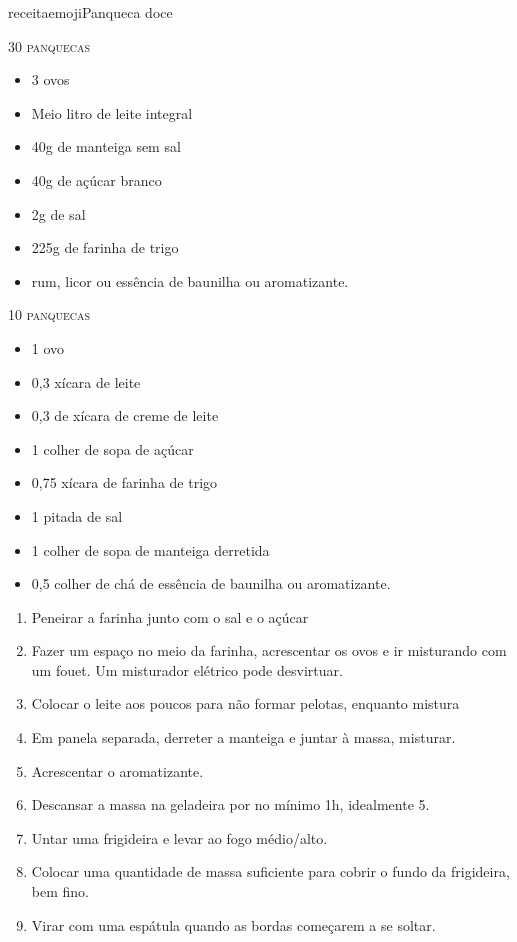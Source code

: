 receitaemoji{Panqueca doce}{

		\textsc{30 panquecas}

		\begin{itemize}
			\item 3 ovos
			\item Meio litro de leite integral
			\item 40g de manteiga sem sal
			\item 40g de açúcar branco
			\item 2g de sal
			\item 225g de farinha de trigo
			\item rum, licor ou essência de baunilha ou aromatizante.
		\end{itemize}

		\textsc{10 panquecas}
		\begin{itemize}
			\item 1 ovo
			\item 0,3 xícara de leite
			\item 0,3 de xícara de creme de leite
			\item 1 colher de sopa de açúcar
			\item 0,75 xícara de farinha de trigo
			\item 1 pitada de sal
			\item 1 colher de sopa de manteiga derretida
			\item 0,5 colher de chá de essência de baunilha ou aromatizante.
		\end{itemize}
	}{
		\begin{enumerate}
			\item Peneirar a farinha junto com o sal e o açúcar
			\item Fazer um espaço no meio da farinha, acrescentar os ovos e ir misturando
			      com um fouet. Um misturador elétrico pode desvirtuar.
			\item Colocar o leite aos poucos para não formar pelotas, enquanto mistura
			\item Em panela separada, derreter a manteiga e juntar à massa, misturar.
			\item Acrescentar o aromatizante.
			\item Descansar a massa na geladeira por no mínimo 1h, idealmente 5.
			\item Untar uma frigideira e levar ao fogo médio/alto.
			\item Colocar uma quantidade de massa suficiente para cobrir o fundo da
			      frigideira, bem fino.
			\item Virar com uma espátula quando as bordas começarem a se soltar.
		\end{enumerate}
	}


